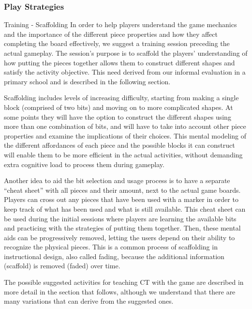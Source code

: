 \documentclass{acm_proc_article-sp}
\begin{document}
\subsubsection{Play Strategies}
Training - Scaffolding
In order to help players understand the game mechanics and the importance of the different piece properties and how they affect completing the board effectively, we suggest a training session preceding the actual gameplay. The session’s purpose is to scaffold the players’ understanding of how putting the pieces together allows them to construct different shapes and satisfy the activity objective. This need derived from our informal evaluation in a primary school and is described in the following section.

Scaffolding includes levels of increasing difficulty, starting from making a single block (comprised of two bits) and moving on to more complicated shapes. At some points they will have the option to construct the different shapes using more than one combination of bits, and will have to take into account other piece properties and examine the implications of their choices. This mental modeling of the different affordances of each piece and the possible blocks it can construct will enable them to be more efficient in the actual activities, without demanding extra cognitive load to process them during gameplay. 

Another idea to aid the bit selection and usage process is to have a separate “cheat sheet” with all pieces and their amount, next to the actual game boards. Players can cross out any pieces that have been used with a marker in order to keep track of what has been used and what is still available. This cheat sheet can be used during the initial sessions where players are learning the available bits and practicing with the strategies of putting them together. Then, these mental aids can be progressively removed, letting the users depend on their ability to recognize the physical pieces. This is a common process of scaffolding in instructional design, also called fading, because the additional information (scaffold) is removed (faded) over time.

The possible suggested activities for teaching CT with the game are described in more detail in the section that follows, although we understand that there are many variations that can derive from the suggested ones.
\end{document}

